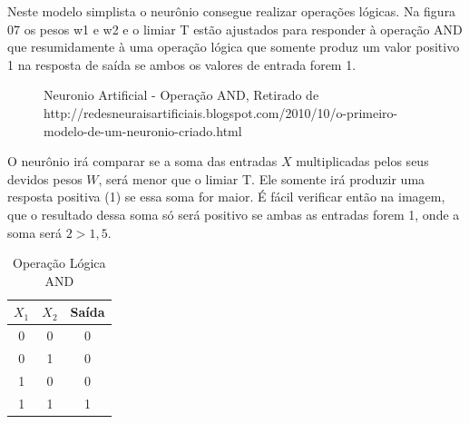 \documentclass[	12pt, Times, openright, twoside, a4paper, english, brazil]{abntex2}
\begin{document}
            Neste modelo simplista o neurônio consegue realizar operações lógicas. Na figura 07 os pesos w1 e w2 e o limiar T estão ajustados para responder à operação AND que resumidamente à uma operação lógica que somente produz um valor positivo 1 na resposta de saída se ambos os valores de entrada forem 1.
            \begin{figure}[!ht]
              \caption{Neuronio Artificial - Operação AND, Retirado de http://redesneuraisartificiais.blogspot.com/2010/10/o-primeiro-modelo-de-um-neuronio-criado.html\label{fig:NeuronioArtificialAnd}}
            \end{figure}
           O neurônio irá comparar se a soma das entradas $X$ multiplicadas pelos seus devidos pesos $W$, será menor que o limiar T. Ele somente irá produzir uma resposta positiva (1) se essa soma for maior. É fácil verificar então na imagem, que o resultado dessa soma só será positivo  se ambas as entradas forem 1, onde a soma será $2>1,5$.

            \begin{table}[!ht]
            \centering
            \caption{Operação Lógica AND} \label{tab:and}
              \begin{tabular}{|c|c|c|}
                  \hline  \textbf{$X_1$} & \textbf{$X_2$} &  \textbf{Saída}\\
                  \hline 0 & 0 & 0\\
                  \hline 0 & 1 & 0\\
                  \hline 1 & 0 & 0\\
                  \hline 1 & 1 & 1\\
                  \hline 
              \end{tabular}
            \end{table}
\end{document}
